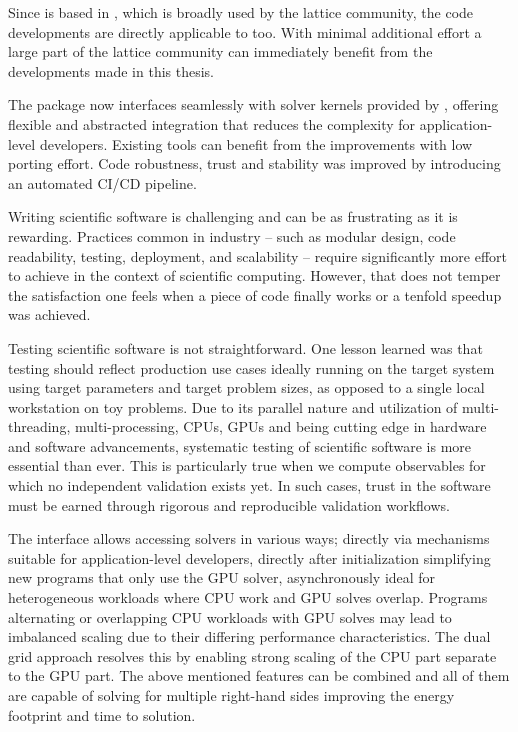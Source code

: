 Since \openqxd is based in \openqcd, which is broadly used by the lattice community, the code developments are directly applicable to \openqcd too.
With minimal additional effort a large part of the lattice community can immediately benefit from the developments made in this thesis.

The \openqxd package now interfaces seamlessly with solver kernels provided by \quda, offering flexible and abstracted integration that reduces the complexity for application-level developers.
Existing tools can benefit from the improvements with low porting effort.
Code robustness, trust and stability was improved by introducing an automated CI/CD pipeline.

Writing scientific software is challenging and can be as frustrating as it is rewarding.
Practices common in industry -- such as modular design, code readability, testing, deployment, and scalability -- require significantly more effort to achieve in the context of scientific computing.
However, that does not temper the satisfaction one feels when a piece of code finally works or a tenfold speedup was achieved.

Testing scientific software is not straightforward.
One lesson learned was that testing should reflect production use cases ideally running on the target system using target parameters and target problem sizes, as opposed to a single local workstation on toy problems.
Due to its parallel nature and utilization of multi-threading, multi-processing, CPUs, GPUs and being cutting edge in hardware and software advancements, systematic testing of scientific software is more essential than ever.
This is particularly true when we compute observables for which no independent validation exists yet.
In such cases, trust in the software must be earned through rigorous and reproducible validation workflows.

The interface allows accessing solvers in various ways; directly via \openqxd mechanisms suitable for application-level developers, directly after initialization simplifying new programs that only use the GPU solver, asynchronously ideal for heterogeneous workloads where CPU work and GPU solves overlap.
Programs alternating or overlapping CPU workloads with GPU solves may lead to imbalanced scaling due to their differing performance characteristics.
The dual grid approach resolves this by enabling strong scaling of the CPU part separate to the GPU part.
The above mentioned features can be combined and all of them are capable of solving for multiple right-hand sides improving the energy footprint and time to solution.

